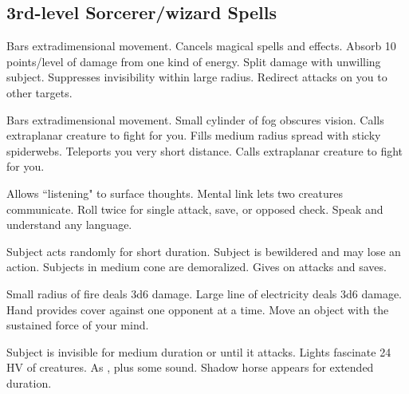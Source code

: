 \subsection{3rd-level Sorcerer/wizard Spells} 
\begin{swspelllist}
 Bars extradimensional movement.
 Cancels magical spells and effects.
 Absorb 10 points/level of damage from one kind of energy.
 Split damage with unwilling subject.
 Suppresses invisibility within large radius.
 Redirect attacks on you to other targets.

 Bars extradimensional movement.
 Small cylinder of fog obscures vision.
 Calls extraplanar creature to fight for you.
 Fills medium radius spread with sticky spiderwebs.
 Teleports you very short distance.
 Calls extraplanar creature to fight for you.

 Allows ``listening" to surface thoughts.
 Mental link lets two creatures communicate.
 Roll twice for single attack, save, or opposed check.
 Speak and understand any language.

 Subject acts randomly for short duration.
 Subject is bewildered and may lose an action.
 Subjects in medium cone are demoralized.
 Gives  on attacks and saves.

 Small radius of fire deals 3d6 damage.
 Large line of electricity deals 3d6 damage.
 Hand provides cover against one opponent at a time.
 Move an object with the sustained force of your mind.

 Subject is invisible for medium duration or until it attacks.
 Lights fascinate 24 HV of creatures.
 As , plus some sound.
 Shadow horse appears for extended duration.


\end{swspelllist}
